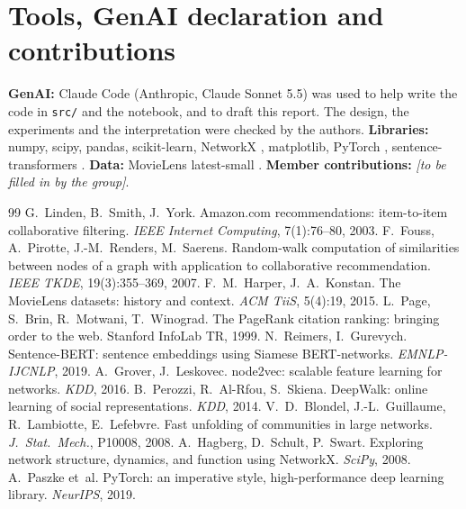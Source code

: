\documentclass[11pt,a4paper]{article}
\begin{document}
\section*{Tools, GenAI declaration and contributions}
\textbf{GenAI:} Claude Code (Anthropic, Claude Sonnet 5.5) was used to help write the code in \texttt{src/} and the notebook, and to draft this report. The design, the experiments and the interpretation were checked by the authors. \textbf{Libraries:} numpy, scipy, pandas, scikit-learn, NetworkX \citep{hagberg2008}, matplotlib, PyTorch \citep{paszke2019}, sentence-transformers \citep{reimers2019}. \textbf{Data:} MovieLens latest-small \citep{harper2015}. \textbf{Member contributions:} \emph{[to be filled in by the group]}.

\begin{thebibliography}{99}\small
{} G.~Linden, B.~Smith, J.~York. Amazon.com recommendations: item-to-item collaborative filtering. \emph{IEEE Internet Computing}, 7(1):76--80, 2003.
 F.~Fouss, A.~Pirotte, J.-M.~Renders, M.~Saerens. Random-walk computation of similarities between nodes of a graph with application to collaborative recommendation. \emph{IEEE TKDE}, 19(3):355--369, 2007.
 F.~M.~Harper, J.~A.~Konstan. The MovieLens datasets: history and context. \emph{ACM TiiS}, 5(4):19, 2015.
 L.~Page, S.~Brin, R.~Motwani, T.~Winograd. The PageRank citation ranking: bringing order to the web. Stanford InfoLab TR, 1999.
 N.~Reimers, I.~Gurevych. Sentence-BERT: sentence embeddings using Siamese BERT-networks. \emph{EMNLP-IJCNLP}, 2019.
 A.~Grover, J.~Leskovec. node2vec: scalable feature learning for networks. \emph{KDD}, 2016.
 B.~Perozzi, R.~Al-Rfou, S.~Skiena. DeepWalk: online learning of social representations. \emph{KDD}, 2014.
 V.~D.~Blondel, J.-L.~Guillaume, R.~Lambiotte, E.~Lefebvre. Fast unfolding of communities in large networks. \emph{J.\ Stat.\ Mech.}, P10008, 2008.
 A.~Hagberg, D.~Schult, P.~Swart. Exploring network structure, dynamics, and function using NetworkX. \emph{SciPy}, 2008.
 A.~Paszke et~al. PyTorch: an imperative style, high-performance deep learning library. \emph{NeurIPS}, 2019.
\end{thebibliography}
\end{document}
